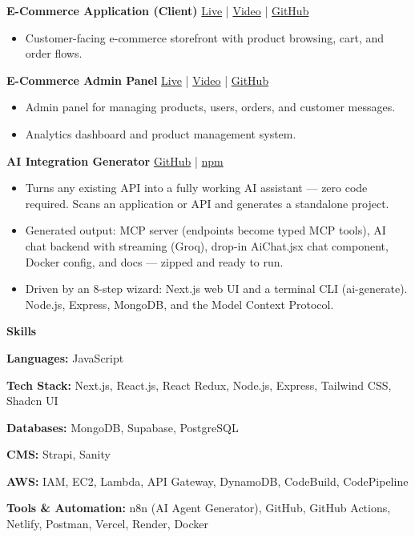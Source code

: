 \documentclass[10pt]{article}
\newcommand{\sectiontitle}[1]{%
  \par\vspace{8pt}%
  \noindent\textbf{\large #1}\par
  \vspace{-2pt}\noindent\hrulefill\par
  \vspace{4pt}%
}
\begin{document}
\noindent\textbf{E-Commerce Application (Client)} \hfill
\href{https://uzerqureshi-eccom.netlify.app}{Live} | \href{https://youtu.be/yDyqnpCzAOU}{Video} | \href{https://github.com/08Uzair/Uzer-2024}{GitHub}\par
\vspace{2pt}
\begin{itemize}
  \item Customer-facing e-commerce storefront with product browsing, cart, and order flows.
\end{itemize}

\noindent\textbf{E-Commerce Admin Panel} \hfill
\href{https://uzerqureshi-eccom-admin.netlify.app}{Live} | \href{https://youtu.be/aHzWbpDV-KA}{Video} | \href{https://github.com/08Uzair/Uzer-2024}{GitHub}\par
\vspace{2pt}
\begin{itemize}
  \item Admin panel for managing products, users, orders, and customer messages.
  \item Analytics dashboard and product management system.
\end{itemize}

\noindent\textbf{AI Integration Generator} \hfill
\href{https://github.com/08Uzair/CUSTOM-MCP}{GitHub} | \href{https://www.npmjs.com/package/ai-integration-generator-cli}{npm}\par
\vspace{2pt}
\begin{itemize}
  \item Turns any existing API into a fully working AI assistant --- zero code required. Scans an application or API and generates a standalone project.
  \item Generated output: MCP server (endpoints become typed MCP tools), AI chat backend with streaming (Groq), drop-in AiChat.jsx chat component, Docker config, and docs --- zipped and ready to run.
  \item Driven by an 8-step wizard: Next.js web UI and a terminal CLI (ai-generate). Node.js, Express, MongoDB, and the Model Context Protocol.
\end{itemize}

\sectiontitle{Skills}

{\setlength{\parskip}{2.5pt}
\noindent\textbf{Languages:} JavaScript\par
\noindent\textbf{Tech Stack:} Next.js, React.js, React Redux, Node.js, Express, Tailwind CSS, Shadcn UI\par
\noindent\textbf{Databases:} MongoDB, Supabase, PostgreSQL\par
\noindent\textbf{CMS:} Strapi, Sanity\par
\noindent\textbf{AWS:} IAM, EC2, Lambda, API Gateway, DynamoDB, CodeBuild, CodePipeline\par
\noindent\textbf{Tools \& Automation:} n8n (AI Agent Generator), GitHub, GitHub Actions, Netlify, Postman, Vercel, Render, Docker\par
}
\end{document}
